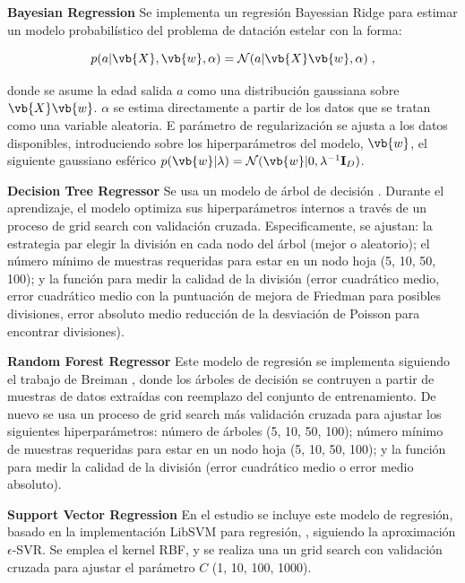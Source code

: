 \textbf{Bayesian Regression} {} Se implementa un regresión Bayessian Ridge para estimar un modelo probabilístico del problema de datación estelar con la forma:

\begin{equation}
p(a|\vb{X},\vb{w},\alpha) = \mathcal{N}(a|\vb{X} \vb{w},\alpha)\; ,
\end{equation}

donde se asume la edad salida $a$ como una distribución gaussiana sobre $\vb{X}\vb{w}$. $\alpha$ se estima directamente a partir de los datos que se tratan como una variable aleatoria. E parámetro de regularización se ajusta a los datos disponibles, introduciendo sobre los hiperparámetros del modelo, \ie $\vb{w}$, el siguiente gaussiano esférico $p(\vb{w}|\lambda) =
\mathcal{N}(\vb{w}|0,\lambda^{-1}\mathbf{I}_{D})$.

\textbf{Decision Tree Regressor} {} Se usa un modelo de árbol de decisión \cite{Breiman1984}. Durante el aprendizaje, el modelo optimiza sus hiperparámetros internos a través de un proceso de grid search con validación cruzada. Especificamente, se ajustan: la estrategia par elegir la división en cada nodo del árbol (mejor o aleatorio); el número mínimo de muestras requeridas para estar en un nodo hoja (5, 10, 50, 100); y la función para medir la calidad de la división (error cuadrático medio, error cuadrático medio con la puntuación de mejora de Friedman para posibles divisiones, error absoluto medio reducción de la desviación de Poisson para encontrar divisiones). 

\textbf{Random Forest Regressor} {} Este modelo de regresión se implementa siguiendo el trabajo de Breiman \cite{Breiman2001}, donde los árboles de decisión se contruyen a partir de muestras de datos extraídas con reemplazo del conjunto de entrenamiento. De nuevo se usa un proceso de grid search más validación cruzada para ajustar los siguientes hiperparámetros: número de árboles (5, 10, 50, 100); número mínimo de muestras requeridas para estar en un nodo hoja (5, 10, 50, 100); y la función para medir la calidad de la división (error cuadrático medio o error medio absoluto).

\textbf{Support Vector Regression} {} En el estudio se incluye este modelo de regresión, basado en la implementación LibSVM para regresión, \cite{LIBSVM}, siguiendo la aproximación $\epsilon$-SVR. Se emplea el kernel RBF, y se realiza una un grid search con validación cruzada para ajustar el parámetro $C$ (1, 10, 100, 1000).

